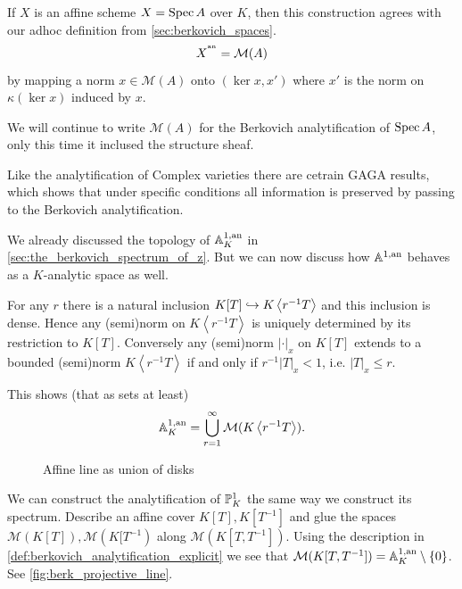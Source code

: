 \begin{remark}
	If $X$ is an affine scheme $X = \operatorname{Spec} A$ over $K$, then this construction agrees with our adhoc definition from \cref{sec:berkovich_spaces}.
	\[
		X^{{}^{\text{an}}} = \mathcal{M} (A)
	\] 
	by mapping a norm $x \in \mathcal{M} (A)$ onto $(\ker x, x')$ where $x'$ is the norm on $\kappa(\ker x)$ induced by $x$. 

	We will continue to write $\mathcal{M} (A)$ for the Berkovich analytification of $\operatorname{Spec} A$, only this time it inclused the structure sheaf. 
\end{remark}

Like the analytification of Complex varieties there are cetrain GAGA results, which shows that under specific conditions all information is preserved by passing to the Berkovich analytification. 


\begin{example}
	We already discussed the topology of $\mathbb{A}^{1, \text{an}}_K$ in \cref{sec:the_berkovich_spectrum_of_z}. 
	But we can now discuss how $\mathbb{A}^{1, \text{an}}$ behaves as a $K$-analytic space as well. 

	For any $r$ there is a natural inclusion $K[T] \hookrightarrow K\left<r^{-1} T \right>$ and this inclusion is dense. 
	Hence any (semi)norm on $K\left<r^{-1}T \right>$ is uniquely determined by its restriction to $K[T]$.
	Conversely any (semi)norm $|\cdot |_x$ on  $K[T]$ extends to a bounded (semi)norm $K\left<r^{-1}T \right>$ if and only if $r^{-1}|T|_x < 1$, i.e. $|T|_x \le r$. 

	This shows (that as sets at least)
	\[
		\mathbb{A}^{1, \text{an}}_K = \bigcup_{r = 1} ^{\infty} \mathcal{M} (K\left<r^{-1} T \right>)
	.\] 

\begin{figure}[ht]
    \centering
    \caption{Affine line as union of disks}
    \label{fig:affine-line-as-union-of-disks}
\end{figure}
\end{example}

\begin{example}
	We can construct the analytification of $\mathbb{P}^{1}_K$ the same way we construct its spectrum. 
Describe an affine cover $K[T], K[T^{-1}]$ and glue the spaces $\mathcal{M} (K[T]), \mathcal{M} (K[T^{-1})$ along $\mathcal{M} (K[T, T^{-1}])$. 
Using the description in \cref{def:berkovich_analytification_explicit} we see that $\mathcal{M} (K[T, T^{-1}]) = \mathbb{A}^{1, \text{an}}_K \setminus \{0\} $.
See \cref{fig:berk_projective_line}. 
\end{example}

